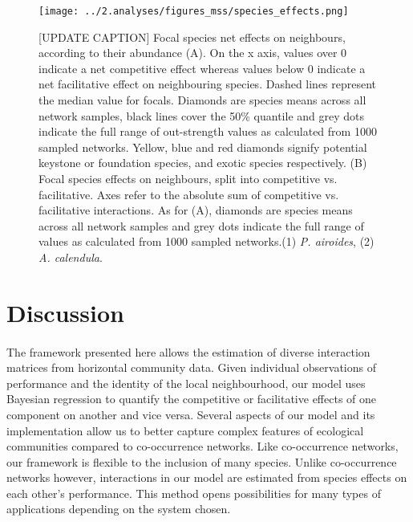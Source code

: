 \documentclass[a4,12pt]{article}
\begin{document}
\begin{itemize}
    \begin{figure}[H]
        \begin{centering}
        \texttt{[image: ../2.analyses/figures\_mss/species\_effects.png]}
        \caption{[UPDATE CAPTION] Focal species net effects on neighbours, according to their abundance (A). On the x axis, values over 0 indicate a net competitive effect whereas values below 0 indicate a net facilitative effect on neighbouring species. Dashed lines represent the median value for focals. Diamonds are species means across all network samples, black lines cover the 50\% quantile and grey dots indicate the full range of out-strength values as calculated from 1000 sampled networks. Yellow, blue and red diamonds signify potential keystone or foundation species, and exotic species respectively. (B) Focal species effects on neighbours, split into competitive vs. facilitative. Axes refer to the absolute sum of competitive vs. facilitative interactions. As for (A), diamonds are species means across all network samples and grey dots indicate the full range of  values as calculated from 1000 sampled networks.(1) \textit{P. airoides}, (2) \textit{A. calendula}.}
        \label{fig:species}
        \end{centering}
    \end{figure} 





\section{Discussion}
    


    \paragraph{} 
    The framework presented here allows the estimation of diverse interaction matrices from horizontal community data. Given individual observations of performance and the identity of the local neighbourhood, our model uses Bayesian regression to quantify the competitive or facilitative effects of one component on another and vice versa. Several aspects of our model and its implementation allow us to better capture complex features of ecological communities compared to co-occurrence networks. Like co-occurrence networks, our framework is flexible to the inclusion of many species. Unlike co-occurrence networks however, interactions in our model are estimated from species effects on each other's performance.  This method opens possibilities for many types of applications depending on the system chosen.



\end{itemize}
\end{document}
